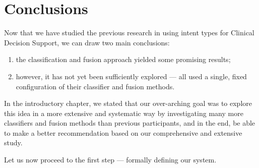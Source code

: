 \section{Conclusions}
Now that we have studied the previous research in
using intent types for Clinical Decision Support, we can draw two main conclusions:
\begin{enumerate}
 \item the classification and fusion approach yielded some promising results;
 \item however, it has not yet been sufficiently explored --- \cite{choi, FDUMedSearch, soldani, limsi2015}
 all used a single, fixed configuration of their classifier and fusion methods.
\end{enumerate}

In the introductory chapter, we stated that our over-arching goal was to
explore this idea in a more extensive and systematic way by investigating
many more classifiers and fusion methods than previous participants, and in the end,
be able to make a better recommendation based on our comprehensive and extensive study.

Let us now proceed to the first step --- formally defining our system.


